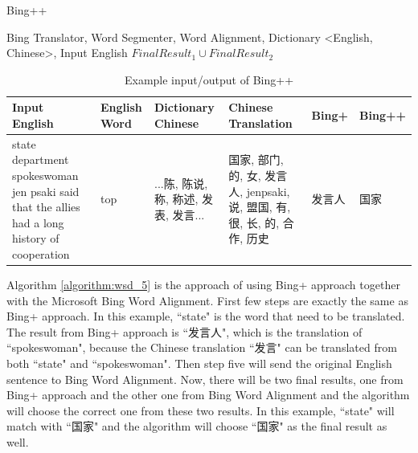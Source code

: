 \begin{algorithm}[ht]
\caption{Bing++}
\label{algorithm:wsd_5}
\begin{algorithmic}
\REQUIRE Bing Translator, Word Segmenter, Word Alignment, Dictionary \textless English, Chinese\textgreater, Input English
        \ENDIF
    \ENDFOR
        \ENDIF
    \ENDFOR
        \ENDIF
    \ENDFOR
\ENDIF
\RETURN $FinalResult_1 \cup FinalResult_2$
\end{algorithmic}
\end{algorithm}

\begin{table}[ht]
    \caption{Example input/output of Bing++}
    \begin{tabular}{| p{4cm} | p{1.2cm} | p{2.3cm} | p{3.5cm} | p{1.5cm} | p{1.5cm} |}
        \hline
        Input English & English Word & Dictionary Chinese & Chinese Translation & Bing+ & Bing++ \\
        \hline
        state department spokeswoman jen psaki said that the allies had a long history of cooperation & top & ...陈, 陈说, 称, 称述, 发表, 发言... & 国家, 部门, 的, 女, 发言人, jenpsaki, 说, 盟国, 有, 很, 长, 的, 合作, 历史 & 发言人 & 国家 \\
        \hline
    \end{tabular}
\end{table}


Algorithm \ref{algorithm:wsd_5} is the approach of using Bing+ approach together with the Microsoft Bing Word Alignment. First few steps are exactly the same as Bing+ approach. In this example, ``state" is the word that need to be translated. The result from Bing+ approach is ``发言人", which is the translation of ``spokeswoman", because the Chinese translation ``发言" can be translated from both ``state" and ``spokeswoman". Then step five will send the original English sentence to Bing Word Alignment. Now, there will be two final results, one from Bing+ approach and the other one from Bing Word Alignment and the algorithm will choose the correct one from these two results. In this example, ``state" will match with ``国家" and the algorithm will choose ``国家" as the final result as well.


